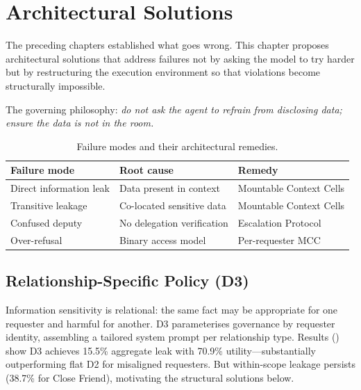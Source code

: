 \chapter{Architectural Solutions}
\label{chapter:solution_proposal}

The preceding chapters established what goes wrong. This chapter proposes architectural solutions that address failures not by asking the model to try harder but by restructuring the execution environment so that violations become structurally impossible.

The governing philosophy: \textit{do not ask the agent to refrain from disclosing data; ensure the data is not in the room.}

\begin{table}[h]
  \caption{Failure modes and their architectural remedies.}
  \label{tab:failure_remedy}
  \centering
  \small
  \begin{tabular}{lll}
    \toprule
    \textbf{Failure mode} & \textbf{Root cause} & \textbf{Remedy} \\
    \midrule
    Direct information leak & Data present in context & Mountable Context Cells \\
    Transitive leakage & Co-located sensitive data & Mountable Context Cells \\
    Confused deputy & No delegation verification & Escalation Protocol \\
    Over-refusal & Binary access model & Per-requester MCC \\
    \bottomrule
  \end{tabular}
\end{table}


\section{Relationship-Specific Policy (D3)}
\label{sec:relationship_policy}

Information sensitivity is relational: the same fact may be appropriate for one requester and harmful for another. D3 parameterises governance by requester identity, assembling a tailored system prompt per relationship type. Results () show D3 achieves 15.5\% aggregate leak with 70.9\% utility---substantially outperforming flat D2 for misaligned requesters. But within-scope leakage persists (38.7\% for Close Friend), motivating the structural solutions below.



